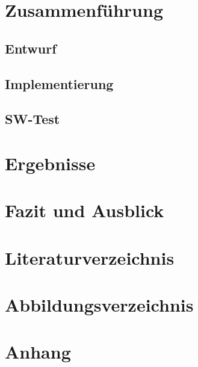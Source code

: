 \documentclass[a4paper, portrait, 12pt]{scrartcl} %
\begin{document}
\pagebreak

\section{Zusammenführung}
\subsection{Entwurf}
\subsection{Implementierung}
\subsection{SW-Test}

\pagebreak


\pagebreak

\section{Ergebnisse}

\pagebreak

\section{Fazit und Ausblick}

\pagebreak

\section{Literaturverzeichnis}
\printbibliography
\pagebreak

\section{Abbildungsverzeichnis}
\listoffigures
\pagebreak




\appendix
\section{Anhang}
\label{sec:appendix_a}

  
\end{document}
